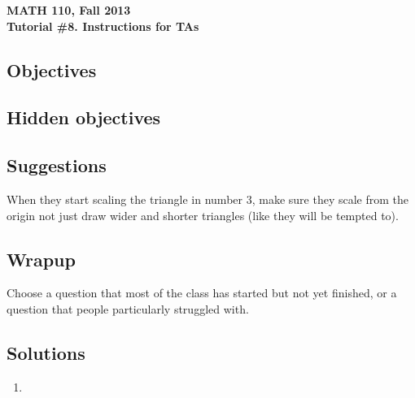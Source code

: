 \documentclass[11pt]{exam}
\newcommand{\mthCourse}{MATH 110}
\newcommand{\mthTerm}{Fall 2013}
\newcommand{\mthTutorialNumber}{8}
\begin{document}
\newpage
{\small
	\begin{center}
		{\bf \mthCourse, \mthTerm}\\ 
		{\bf Tutorial \#\mthTutorialNumber. Instructions for TAs}
	\end{center}
}

\subsection*{Objectives}


\subsection*{Hidden objectives}


\subsection*{Suggestions}
	When they start scaling the triangle in number 3, make sure they scale from the origin 
	not just draw wider and shorter triangles (like they will be tempted to).

\subsection*{Wrapup}
	Choose a question that most of the class has started but not yet finished,
	or a question that people particularly struggled with.

\subsection*{Solutions}
\begin{enumerate}
	\item
\end{enumerate}
	
\end{document}

